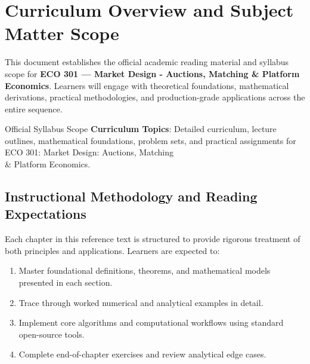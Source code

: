 \section{Curriculum Overview and Subject Matter Scope}

This document establishes the official academic reading material and syllabus scope for \textbf{ECO 301 --- Market Design - Auctions, Matching \& Platform Economics}. Learners will engage with theoretical foundations, mathematical derivations, practical methodologies, and production-grade applications across the entire sequence.

\begin{InsightBox}{Official Syllabus Scope}
  \textbf{Curriculum Topics}: Detailed curriculum, lecture outlines, mathematical foundations, problem sets, and practical assignments for ECO 301: Market Design: Auctions, Matching \\& Platform Economics.
\end{InsightBox}

\subsection{Instructional Methodology and Reading Expectations}

Each chapter in this reference text is structured to provide rigorous treatment of both principles and applications. Learners are expected to:
\begin{enumerate}
  \item Master foundational definitions, theorems, and mathematical models presented in each section.
  \item Trace through worked numerical and analytical examples in detail.
  \item Implement core algorithms and computational workflows using standard open-source tools.
  \item Complete end-of-chapter exercises and review analytical edge cases.
\end{enumerate}

